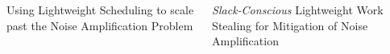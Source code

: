 \documentclass[serif,mathserif,final]{beamer}
\begin{document}
\begin{frame}{}
\begin{columns}[t]
\begin{column}{0.33\linewidth}
\begin{block}{\small Using Lightweight Scheduling to scale past the Noise Amplification Problem}
\begin{columns}[t]
         \end{columns}
\end{block}

      
      
       
      \end{column} %

\begin{column}{0.27\linewidth} 


\begin{block}{\small \textit{Slack-Conscious} Lightweight Work Stealing for Mitigation of Noise Amplification} 


\end{block}
\end{column}
\end{columns}
\end{frame}
\end{document}
